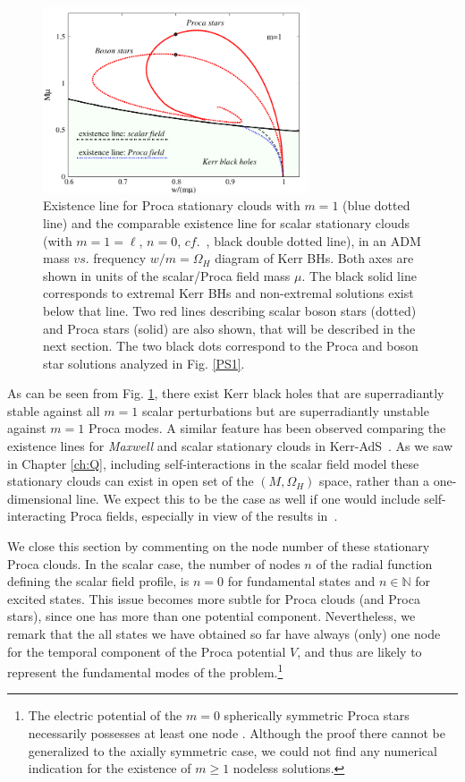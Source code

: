 \begin{figure}[h!]
  \begin{center}
    \includegraphics[width=0.7\textwidth]{papers/Proca/wM-m1-comparison.pdf}
  \end{center}
  \caption{Existence line for Proca stationary clouds with $m=1$ (blue dotted line) and the comparable existence line for scalar stationary clouds (with $m=1=\ell$, $n=0$, $cf.$~\cite{Benone:2014ssa}, black double dotted line), in an ADM mass $vs.$ frequency $w/m=\Omega_H$ diagram of Kerr BHs. Both axes are shown in units of the scalar/Proca field mass $\mu$. The black solid line corresponds to extremal Kerr BHs and non-extremal solutions exist below that line. Two red lines describing scalar boson stars (dotted) and Proca stars (solid) are also shown, that will be described in the next section. The two black dots correspond to the Proca and boson star solutions analyzed in Fig. \ref{PS1}.}
  \label{clouds}
\end{figure}

As can be seen from Fig. \ref{clouds}, there exist Kerr black holes that are superradiantly stable against all $m=1$ scalar perturbations but are superradiantly unstable against $m=1$ Proca modes.
A similar feature has been observed comparing the existence lines for \textit{Maxwell} and scalar stationary clouds in Kerr-AdS~\cite{Wang:2015fgp}.
As we saw in Chapter \ref{ch:Q}, including self-interactions in the scalar field model these stationary clouds can exist in open set of the $(M,\Omega_H)$ space, rather than a one-dimensional line.
We expect this to be the case as well if one would include self-interacting Proca fields, especially in view of the results in~\cite{Loginov:2015rya}.

We close this section by commenting on the node number of these stationary Proca clouds. 
In the scalar case, the number of nodes $n$ of the radial function defining the scalar field profile, 
is $n=0$ for fundamental states and $n\in \mathbb{N}$ for excited states. 
This issue becomes more subtle for Proca clouds (and Proca stars), 
since one has more than one potential component. Nevertheless, we remark that the all states we have obtained so far have always (only)
one node for the temporal component of the Proca potential  $V$, and thus are likely to represent the fundamental
modes of the problem.\footnote{The electric potential of the $m=0$ 
spherically symmetric Proca stars necessarily possesses at least one node \cite{Brito:2015pxa}.
Although the proof there cannot be generalized to the axially symmetric case,
we could not find any numerical indication for the existence of $m\geq 1$ nodeless solutions. 
}

